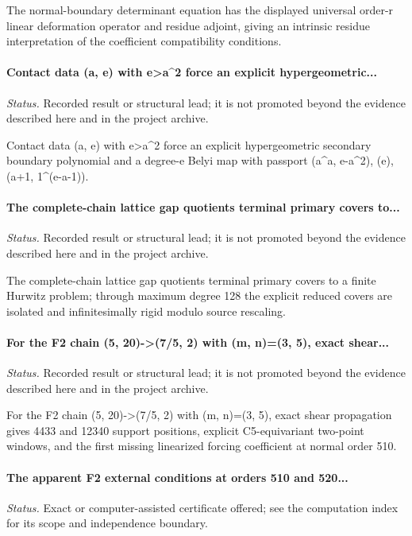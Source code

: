 The normal-boundary determinant equation has the displayed universal order-r linear deformation operator and residue adjoint, giving an intrinsic residue interpretation of the coefficient compatibility conditions.

\label{supp-note-06-031}
\paragraph{Contact data (a, e) with e>a\textasciicircum{}2 force an explicit hypergeometric...}
\emph{Status.} Recorded result or structural lead; it is not promoted beyond the evidence described here and in the project archive.

Contact data (a, e) with e>a\textasciicircum{}2 force an explicit hypergeometric secondary boundary polynomial and a degree-e Belyi map with passport (a\textasciicircum{}a, e-a\textasciicircum{}2), (e), (a+1, 1\textasciicircum{}(e-a-1)).

\label{supp-note-06-032}
\paragraph{The complete-chain lattice gap quotients terminal primary covers to...}
\emph{Status.} Recorded result or structural lead; it is not promoted beyond the evidence described here and in the project archive.

The complete-chain lattice gap quotients terminal primary covers to a finite Hurwitz problem; through maximum degree 128 the explicit reduced covers are isolated and infinitesimally rigid modulo source rescaling.

\label{supp-note-06-033}
\paragraph{For the F2 chain (5, 20)->(7/5, 2) with (m, n)=(3, 5), exact shear...}
\emph{Status.} Recorded result or structural lead; it is not promoted beyond the evidence described here and in the project archive.

For the F2 chain (5, 20)->(7/5, 2) with (m, n)=(3, 5), exact shear propagation gives 4433 and 12340 support positions, explicit C5-equivariant two-point windows, and the first missing linearized forcing coefficient at normal order 510.

\label{supp-note-06-034}
\paragraph{The apparent F2 external conditions at orders 510 and 520...}
\emph{Status.} Exact or computer-assisted certificate offered; see the computation index for its scope and independence boundary.

